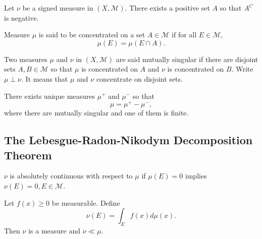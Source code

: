 \documentclass[class=book, crop=false]{standalone}
\begin{document}
        \begin{theorem}
            Let $\nu$ be a signed measure in $(X, \mathscr{M})$. There exists a positive set $A$ so that $A^C$ is negative.
        \end{theorem}

        \begin{definition}
            Measure $\mu$ is said to be concentrated on a set $A \in \mathscr{M}$ if for all $E \in \mathscr{M}$,
            \begin{equation*}
                \mu(E) = \mu(E \cap A).
            \end{equation*}
        \end{definition}

        \begin{definition}
            Two measures $\mu$ and $\nu$ in $(X, \mathscr{M})$ are said mutually singular if there are disjoint sets $A, B \in \mathscr{M}$ so that $\mu$ is concentrated on $A$ and $\nu$ is concentrated on $B$. Write $\mu \perp \nu$. It means that $\mu$ and $\nu$ concentrate on disjoint sets.
        \end{definition}

        \begin{definition}
            There exists unique measures $\mu^+$ and $\mu^-$ so that
            \begin{equation*}
                \mu = \mu^+ - \mu^-,
            \end{equation*}
            where there are mutually singular and one of them is finite.
        \end{definition}

        \subsection{The Lebesgue-Radon-Nikodym Decomposition Theorem}
        \begin{theorem}
            $\nu$ is absolutely continuous with respect to $\mu$ if $\mu(E) = 0$ implies $\nu(E) = 0, E \in \mathscr{M}$.
        \end{theorem}

        \begin{theorem}
            Let $f(x) \geq 0$ be measurable. Define
            \begin{equation*}
                \nu(E) = \int_E f(x) d\mu(x).
            \end{equation*}
            Then $\nu$ is a measure and $\nu \ll \mu$.
        \end{theorem}
\end{document}
